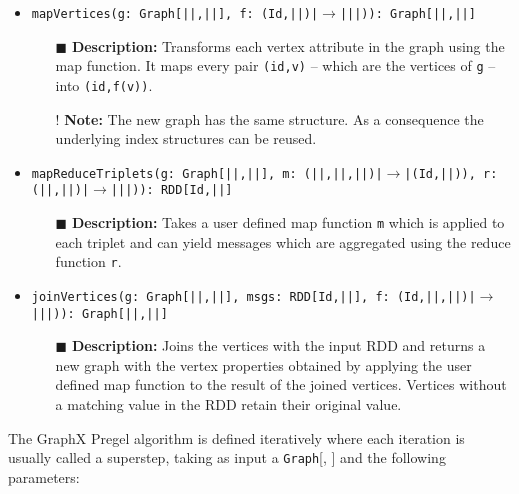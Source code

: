 \begin{itemize}
    \setlength\itemsep{1em}
    \item \texttt{mapVertices(g: Graph[|\VertSet|,|\EdgeSet|], f: (Id,|\VertSet|)|$\rightarrow$||\VertSet|)): Graph[|\VertSet|,|\EdgeSet|]}
          \begin{itemize}
              \item[$\blacksquare$] \textbf{Description:} Transforms each vertex attribute in the graph using the map function. It maps every pair \texttt{(id,v)} -- which are the vertices of \texttt{g} -- into \texttt{(id,f(v))}.
              \item[!] \textbf{Note:} The new graph has the same structure. As a consequence the underlying index structures can be reused.
          \end{itemize}
    \item \texttt{mapReduceTriplets(g: Graph[|\VertSet|,|\EdgeSet|], m: (|\VertSet|,|\EdgeSet|,|\VertSet|)|$\rightarrow$|(Id,|\MsgSet|)), r: (|\MsgSet|,|\MsgSet|)|$\rightarrow$||\MsgSet|)): RDD[Id,|\MsgSet|]}
          \begin{itemize}
              \item[$\blacksquare$] \textbf{Description:} Takes a user defined map function \texttt{m} which is applied to each triplet and can yield messages which are aggregated using the reduce function \texttt{r}.
          \end{itemize}
    \item \texttt{joinVertices(g: Graph[|\VertSet|,|\EdgeSet|], msgs: RDD[Id,|\MsgSet|], f: (Id,|\VertSet|,|\MsgSet|)|$\rightarrow$||\VertSet|)): Graph[|\VertSet|,|\EdgeSet|]}
          \begin{itemize}
              \item[$\blacksquare$] \textbf{Description:} Joins the vertices with the input RDD and returns a new graph with the vertex properties obtained by applying the user defined map function to the result of the joined vertices. Vertices without a matching value in the RDD retain their original value.
          \end{itemize}
\end{itemize}

The GraphX Pregel algorithm is defined iteratively where each iteration is usually called a superstep, taking as input a \texttt{Graph}[\VertSet, \EdgeSet] and the following parameters:

